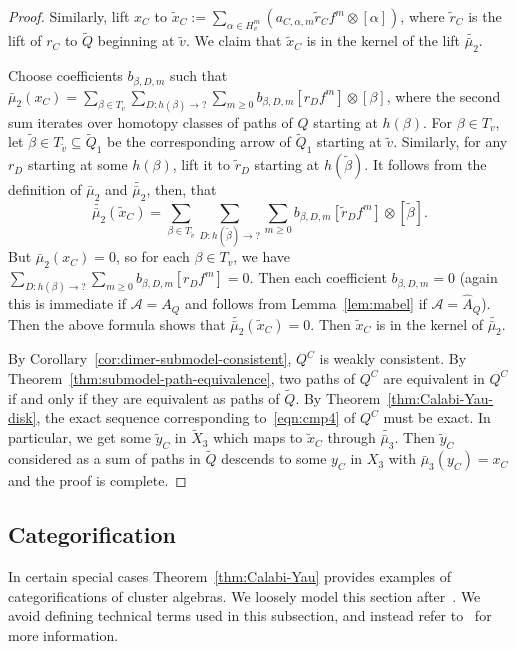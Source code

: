 \documentclass{article}
\theoremstyle{definition}
\newcommand{\A}{{\mathcal A}}
\begin{document}
\begin{proof}
	{Similarly, lift $x_C$ to $\tilde x_C:=\sum_{\alpha\in H_v^{m}}(a_{C,\alpha,m}\tilde r_Cf^m\otimes[\alpha])$, where $\tilde r_C$ is the lift of $r_C$ to $\widetilde Q$ beginning at $\tilde v$. We claim that $\tilde x_C$ is in the kernel of the lift $\widetilde{\bar\mu_2}$.}

	Choose coefficients $b_{\beta,D,m}$ such that $\bar\mu_2(x_C)=\sum_{\beta\in T_v}\sum_{D:h(\beta)\to?}\sum_{m\geq0}b_{\beta,D,m}[r_Df^m]\otimes[\beta]$, where the second sum iterates over homotopy classes of paths of $Q$ starting at $h(\beta)$. For $\beta\in T_v$, let $\tilde\beta\in T_{\tilde v}\subseteq \widetilde Q_1$ be the corresponding arrow of $\widetilde Q_1$ starting at $\tilde v$. Similarly, for any $r_D$ starting at some $h(\beta)$, lift it to $\tilde r_D$ starting at $h(\tilde\beta)$. It follows from the definition of $\bar\mu_2$ and $\widetilde{\bar\mu_2}$, then, that
	\[\widetilde{\bar\mu_2}(\tilde x_C)=\sum_{\beta\in T_{\tilde v}}\sum_{D:h(\tilde\beta)\to?}\sum_{m\geq0}b_{\beta,D,m}[\tilde r_Df^m]\otimes[\tilde\beta].\]
	But $\bar\mu_2(x_C)=0$, so for each $\beta\in T_v$, we have
	$\sum_{D:h(\beta)\to?}\sum_{m\geq0}b_{\beta,D,m}[r_Df^m]=0$. Then each coefficient $b_{\beta,D,m}=0$ (again this is immediate if $\A=A_Q$ and follows from Lemma~\ref{lem:mabel} if $\A=\widehat A_Q$). Then the above formula shows that $\widetilde{\bar\mu_2}(\tilde x_C)=0$.
	Then $\tilde x_C$ is in the kernel of $\widetilde{\bar\mu_2}$.

	 By Corollary~\ref{cor:dimer-submodel-consistent}, $Q^C$ is weakly consistent. By Theorem~\ref{thm:submodel-path-equivalence}, two paths of $Q^C$ are equivalent in $Q^C$ if and only if they are equivalent as paths of $\widetilde Q$. By Theorem~\ref{thm:Calabi-Yau-disk}, the exact sequence corresponding to~\eqref{eqn:cmp4} of $Q^C$ must be exact. In particular, we get some $\tilde y_C$ in $\tilde X_3$ which maps to $\tilde x_C$ through $\widetilde{\bar\mu_3}$. Then $\tilde y_C$ considered as a sum of paths in $\widetilde Q$ descends to some $y_C$ in $X_3$ with $\bar\mu_3(y_C)=x_C$ and the proof is complete.
\end{proof}

\subsection{Categorification}

In certain special cases Theorem~\ref{thm:Calabi-Yau} provides examples of categorifications of cluster algebras. We loosely model this section after~\cite[\S4]{XPressland2019}. We avoid defining technical terms used in this subsection, and instead refer to~\cite{XPressland2019} for more information.
\end{document}
